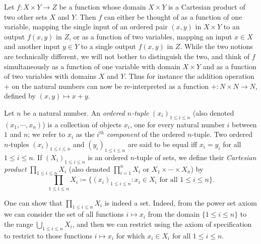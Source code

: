 \begin{note}
Let \(f : X \times Y \to Z\) be a function whose domain \(X \times Y\) is a Cartesian product of two other sets \(X\) and \(Y\).
Then \(f\) can either be thought of as a function of one variable, mapping the single input of an ordered pair \((x, y)\) in \(X \times Y\) to an output \(f(x, y)\) in \(Z\), or as a function of two variables, mapping an input \(x \in X\) and another input \(y \in Y\) to a single output \(f(x, y)\) in \(Z\).
While the two notions are technically different, we will not bother to distinguish the two, and think of \(f\) simultaneously as a function of one variable with domain \(X \times Y\) and as a function of two variables with domains \(X\) and \(Y\).
Thus for instance the addition operation \(+\) on the natural numbers can now be re-interpreted as a function \(+ : N \times N \to N\), defined by \((x, y) \mapsto x + y\).
\end{note}

\setcounter{theorem}{6}
\begin{definition}\label{3.5.7}
Let \(n\) be a natural number.
An \emph{ordered \(n\)-tuple} \((x_i)_{1 \leq i \leq n}\) (also denoted \((x_1, \cdots, x_n)\)) is a collection of objects \(x_i\), one for every natural number \(i\) between \(1\) and \(n\);
we refer to \(x_i\) as the \emph{\(i^{th}\) component} of the ordered \(n\)-tuple.
Two ordered \(n\)-tuples \((x_i)_{1 \leq i \leq n}\) and \((y_i)_{1 \leq i \leq n}\) are said to be equal iff \(x_i = y_i\) for all \(1 \leq i \leq n\).
If \((X_i)_{1 \leq i \leq n}\) is an ordered \(n\)-tuple of sets, we define their \emph{Cartesian product} \(\prod_{1 \leq i \leq n} X_i\) (also denoted \(\prod_{i=1}^n X_i\) or \(X_1 \times \cdots \times X_n\)) by
\[
    \prod_{1 \leq i \leq n} X_i \coloneqq \{(x_i)_{1 \leq i \leq n} : x_i \in X_i \text{ for all } 1 \leq i \leq n\}.
\]
\end{definition}

\begin{remark}\label{3.5.8}
One can show that \(\prod_{1 \leq i \leq n} X_i\) is indeed a set.
Indeed, from the power set axiom we can consider the set of all functions \(i \mapsto x_i\) from the domain \(\{1 \leq i \leq n\}\) to the range \(\bigcup_{1 \leq i \leq n} X_i\), and then we can restrict using the axiom of specification to restrict to those functions \(i \mapsto x_i\) for which \(x_i \in X_i\) for all \(1 \leq i \leq n\).
\end{remark}

